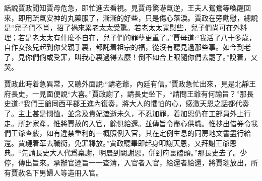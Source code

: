 


\begin{parag}
    話說賈政聞知賈母危急，即忙進去看視。見賈母驚嚇氣逆，王夫人鴛鴦等喚醒回來，即用疏氣安神的丸藥服了，漸漸的好些，只是傷心落淚。賈政在旁勸慰，總說是“兒子們不肖，招了禍來累老太太受驚。若老太太寬慰些，兒子們尚可在外料理；若是老太太有什麼不自在，兒子們的罪孽更重了。”賈母道:“我活了八十多歲，自作女孩兒起到你父親手裏，都託着祖宗的福，從沒有聽見過那些事。如今到老了，見你們倘或受罪，叫我心裏過得去麼！倒不如合上眼隨你們去罷了。”說着，又哭。
\end{parag}


\begin{parag}
    賈政此時着急異常，又聽外面說:“請老爺，內廷有信。”賈政急忙出來，見是北靜王府長史，一見面便說“大喜。”賈政謝了，請長史坐下，“請問王爺有何諭旨？”那長史道:“我們王爺同西平郡王進內復奏，將大人的懼怕的心，感激天恩之話都代奏了。主上甚是憫恤，並念及貴妃溘逝未久，不忍加罪，着加恩仍在工部員外上行走。所封家產，惟將賈赦的入官，餘俱給還。並傳旨令盡心供職。惟抄出借券令我們王爺查覈，如有違禁重利的一概照例入官，其在定例生息的同房地文書盡行給還。賈璉着革去職銜，免罪釋放。”賈政聽畢即起身叩謝天恩，又拜謝王爺恩典。“先請長史大人代爲稟謝，明晨到闕謝恩，併到府裏磕頭。”那長史去了。少停，傳出旨來。承辦官遵旨一一查清，入官者入官，給還者給還，將賈璉放出，所有賈赦名下男婦人等造冊入官。
\end{parag}


